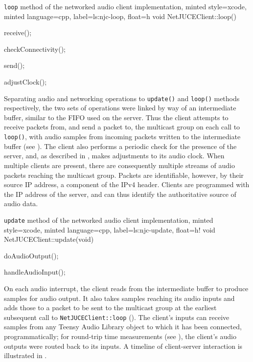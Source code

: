 \begin{codelisting}{
    \texttt{loop} method of the networked audio client implementation,
    minted style=xcode,
    minted language=cpp,
    label=ls:njc-loop,
    float=h
}
    void NetJUCEClient::loop() {
        receive();

        checkConnectivity();

        send();

        adjustClock();
    }
\end{codelisting}

Separating audio and networking operations to \texttt{update()} and
\texttt{loop()} methods respectively, the two sets of operations were linked
by way of an intermediate buffer, similar to the FIFO used on the server.
Thus the client attempts to receive packets from, and send a packet to, the
multicast group on each call to \texttt{loop()}, with audio samples from
incoming packets written to the intermediate buffer (see ).
The client also performs a periodic check for the presence of the server, and,
as described in , makes adjustments to its audio
clock.
When multiple clients are present, there are consequently multiple streams of
audio packets reaching the multicast group.
Packets are identifiable, however, by their source IP address, a component of
the IPv4 header.
Clients are programmed with the IP address of the server, and can thus identify
the authoritative source of audio data.

\begin{codelisting}{
    \texttt{update} method of the networked audio client implementation,
    minted style=xcode,
    minted language=cpp,
    label=ls:njc-update,
    float=h!
}
    void NetJUCEClient::update(void) {
        doAudioOutput();

        handleAudioInput();
    }
\end{codelisting}

On each audio interrupt, the client reads from the intermediate buffer to
produce samples for audio output.
It also takes samples reaching its audio inputs and adds those to a packet to be
sent to the multicast group at the earliest subsequent call to
\texttt{NetJUCEClient::loop} ().
The client's inputs can receive samples from any Teensy Audio Library object to
which it has been connected, programmatically;
for round-trip time measurements (see ), the
client's audio outputs were routed back to its inputs.
A timeline of client-server interaction is illustrated in .

